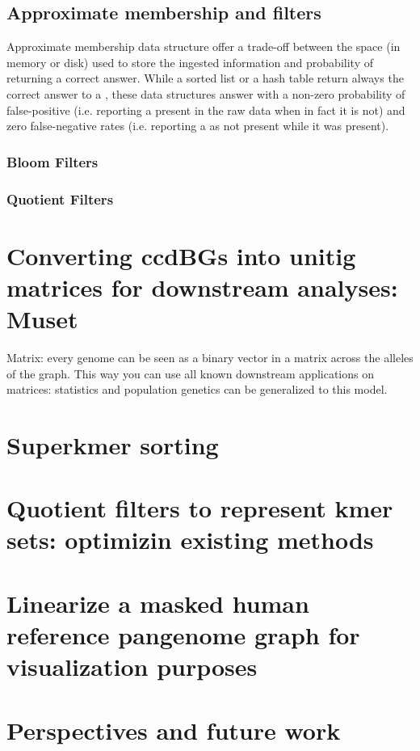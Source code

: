 \subsection{Approximate membership and filters}
Approximate membership data structure offer a trade-off between the space (in memory or disk) used to store the ingested information and probability of returning a correct answer. While a sorted list or a hash table return always the correct answer to a , these data structures answer with a non-zero probability of false-positive (i.e. reporting a \kmer present in the raw data when in fact it is not) and zero false-negative rates (i.e. reporting a \kmer as not present while it was present).
\subsubsection{Bloom Filters}

\subsubsection{Quotient Filters}



\section{Converting ccdBGs into unitig matrices for downstream analyses: Muset}
Matrix: every genome can be seen as a binary vector in a matrix across the alleles of the graph. This way you can use all known downstream applications on matrices: statistics and population genetics can be generalized to this model.

\section{Superkmer sorting}

\section{Quotient filters to represent kmer sets: optimizin existing methods}


\section{Linearize a masked human reference pangenome graph for visualization purposes}

\section{Perspectives and future work}

